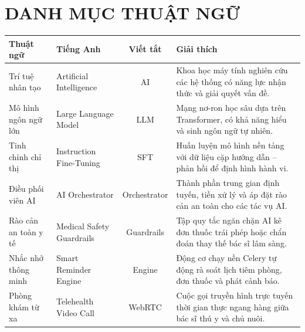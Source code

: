 
\chapter*{DANH MỤC THUẬT NGỮ}

\begin{table}[htbp]
\centering
\begin{tabularx}{\textwidth}{>{\raggedright\arraybackslash}p{3.2cm} >{\raggedright\arraybackslash}p{3.2cm} c >{\raggedright\arraybackslash}X}
    \toprule
    \textbf{Thuật ngữ} & \textbf{Tiếng Anh} & \textbf{Viết tắt} & \textbf{Giải thích} \\
    \midrule
    Trí tuệ nhân tạo & Artificial Intelligence & AI & Khoa học máy tính nghiên cứu các hệ thống có năng lực nhận thức và giải quyết vấn đề. \\
    Mô hình ngôn ngữ lớn & Large Language Model & LLM & Mạng nơ-ron học sâu dựa trên Transformer, có khả năng hiểu và sinh ngôn ngữ tự nhiên. \\
    Tinh chỉnh chỉ thị & Instruction Fine-Tuning & SFT & Huấn luyện mô hình nền tảng với dữ liệu cặp hướng dẫn -- phản hồi để định hình hành vi. \\
    Điều phối viên AI & AI Orchestrator & Orchestrator & Thành phần trung gian định tuyến, tiền xử lý và áp đặt rào cản an toàn cho các tác vụ AI. \\
    Rào cản an toàn y tế & Medical Safety Guardrails & Guardrails & Tập quy tắc ngăn chặn AI kê đơn thuốc trái phép hoặc chẩn đoán thay thế bác sĩ lâm sàng. \\
    Nhắc nhở thông minh & Smart Reminder Engine & Engine & Động cơ chạy nền Celery tự động rà soát lịch tiêm phòng, đơn thuốc và phát cảnh báo. \\
    Phòng khám từ xa & Telehealth Video Call & WebRTC & Cuộc gọi truyền hình trực tuyến thời gian thực ngang hàng giữa bác sĩ thú y và chủ nuôi. \\
    \bottomrule
\end{tabularx}
\end{table}

\clearpage
